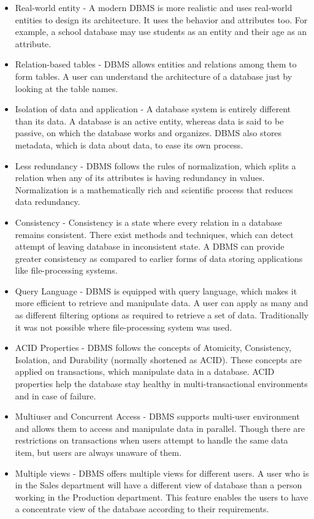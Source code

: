 \begin{itemize}
\item{Real-world entity} - A modern DBMS is more realistic and uses real-world entities to design its architecture. It uses the behavior and attributes too. For example, a school database may use students as an entity and their age as an attribute.
\item{Relation-based tables} - DBMS allows entities and relations among them to form tables. A user can understand the architecture of a database just by looking at the table names.
\item{Isolation of data and application} - A database system is entirely different than its data. A database is an active entity, whereas data is said to be passive, on which the database works and organizes. DBMS also stores metadata, which is data about data, to ease its own process.
\pagestyle{fancy}
\item{Less redundancy} - DBMS follows the rules of normalization, which splits a relation when any of its attributes is having redundancy in values. Normalization is a mathematically rich and scientific process that reduces data redundancy.
\item{Consistency} - Consistency is a state where every relation in a database remains consistent. There exist methods and techniques, which can detect attempt of leaving database in inconsistent state. A DBMS can provide greater consistency as compared to earlier forms of data storing applications like file-processing systems.
\item{Query Language} - DBMS is equipped with query language, which makes it more efficient to retrieve and manipulate data. A user can apply as many and as different filtering options as required to retrieve a set of data. Traditionally it was not possible where file-processing system was used.
\item{ACID Properties} - DBMS follows the concepts of Atomicity, Consistency, Isolation, and Durability (normally shortened as ACID). These concepts are applied on transactions, which manipulate data in a database. ACID properties help the database
stay healthy in multi-transactional environments and in case of failure.
\item{Multiuser and Concurrent Access} - DBMS supports multi-user environment and allows them to access and manipulate data in parallel. Though there are restrictions on transactions when users attempt to handle the same data item, but users are always unaware of them.
\item{Multiple views} - DBMS offers multiple views for different users. A user who is in the Sales department will have a different view of database than a person working in the Production department. This feature enables the users to have a concentrate view of the database according to their requirements.

\end{itemize}
